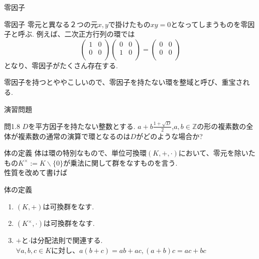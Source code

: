 \documentclass[dvipdfmx,11pt,notheorems]{beamer}
\begin{document}
\begin{frame}{零因子}
  \begin{block}{零因子}
    零元と異なる２つの元$x,y$で掛けたもの$xy=0$となってしまうものを\alert{零因子}と呼ぶ. 例えば、二次正方行列の環では
    \begin{equation}
      \begin{pmatrix}
        1 & 0 \\
        0 & 0 \\
      \end{pmatrix}
      \begin{pmatrix}
        0 & 0 \\
        1 & 0 \\
      \end{pmatrix}
      =
      \begin{pmatrix}
        0 & 0 \\
        0 & 0 \\
      \end{pmatrix}
    \end{equation}
    となり、零因子がたくさん存在する.
  \end{block}
  零因子を持つとややこしいので、零因子を持たない環を\alert{整域}と呼び、重宝される.
\end{frame}
\begin{frame}{演習問題}
  \begin{exampleblock}{問1.8}
    $D$を平方因子を持たない整数とする. $a+b\frac{1+\sqrt{D}}{2}$,$a,b\in \mathbb{Z}$の形の複素数の全体が複素数の通常の演算で環となるのは$D$がどのような場合か?
  \end{exampleblock}
\end{frame}
\begin{frame}{体の定義}
  \alert{体}は環の特別なもので、単位可換環$(K,+,\cdot)$において、零元を除いたもの$K^\times := K\backslash \{0\}$が乗法に関して群をなすものを言う. \\
  性質を改めて書けば
  \begin{block}{体の定義}
    \begin{enumerate}
      \item $(K,+)$は可換群をなす.
      \item $(K^\times,\cdot)$は可換群をなす.
      \item $+$と$\cdot$は分配法則で関連する. \\
      $\forall a,b,c \in K$に対し、$a(b+c)=ab + ac,    (a+b)c=ac+bc$
    \end{enumerate}
  \end{block}
\end{frame}
\end{document}
